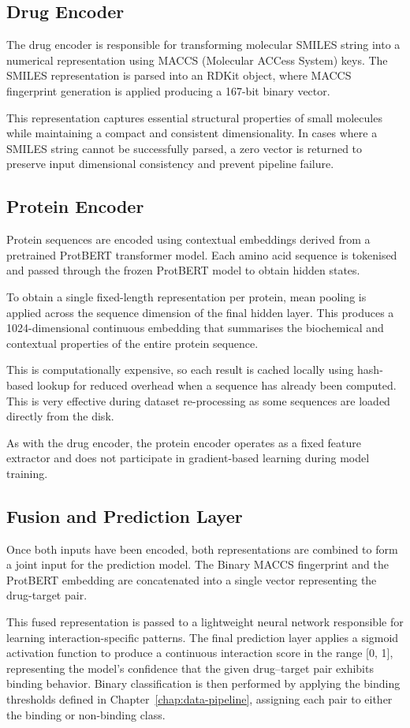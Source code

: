 \subsection{Drug Encoder}
The drug encoder is responsible for transforming molecular SMILES string into a numerical representation using MACCS (Molecular ACCess System) keys. The SMILES representation is parsed into an RDKit object, where MACCS fingerprint generation is applied producing a 167-bit binary vector.

This representation captures essential structural properties of small molecules while maintaining a compact and consistent dimensionality. In cases where a SMILES string cannot be successfully parsed, a zero vector is returned to preserve input dimensional consistency and prevent pipeline failure.

\subsection{Protein Encoder}
Protein sequences are encoded using contextual embeddings derived from a pretrained ProtBERT transformer model. Each amino acid sequence is tokenised and passed through the frozen ProtBERT model to obtain hidden states.

To obtain a single fixed-length representation per protein, mean pooling is applied across the sequence dimension of the final hidden layer. This produces a 1024-dimensional continuous embedding that summarises the biochemical and contextual properties of the entire protein sequence.

This is computationally expensive, so each result is cached locally using hash-based lookup for reduced overhead when a sequence has already been computed. This is very effective during dataset re-processing as some sequences are loaded directly from the disk.

As with the drug encoder, the protein encoder operates as a fixed feature extractor and does not participate in gradient-based learning during model training.
\subsection{Fusion and Prediction Layer}
Once both inputs have been encoded, both representations are combined to form a joint input for the prediction model. The Binary MACCS fingerprint and the ProtBERT embedding are concatenated into a single vector representing the drug-target pair.

This fused representation is passed to a lightweight neural network responsible for learning interaction-specific patterns. The final prediction layer applies a sigmoid activation function to produce a continuous interaction score in the range [0, 1], representing the model’s confidence that the given drug–target pair exhibits binding behavior.
Binary classification is then performed by applying the binding thresholds defined in Chapter~\ref{chap:data-pipeline}, assigning each pair to either the binding or non-binding class.

